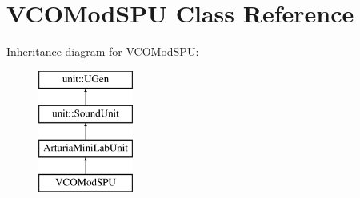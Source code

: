 \hypertarget{classVCOModSPU}{}\section{V\+C\+O\+Mod\+S\+PU Class Reference}
\label{classVCOModSPU}
Inheritance diagram for V\+C\+O\+Mod\+S\+PU\+:\begin{figure}[H]
\begin{center}
\leavevmode
\includegraphics[height=4.000000cm]{classVCOModSPU}
\end{center}
\end{figure}
